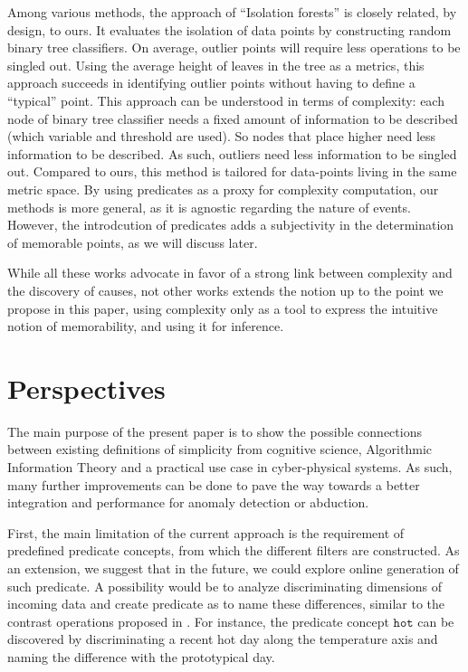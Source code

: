 \documentclass[conference]{IEEEtran}
\begin{document}
Among various methods, the approach of ``Isolation forests''\cite{liu_isolation_2008,hariri_extended_2021} is closely related, by design, to ours. It evaluates the isolation of data points by constructing random binary tree classifiers. On average, outlier points will require less operations to be singled out. Using the average height of leaves in the tree as a metrics, this approach succeeds in identifying outlier points without having to define a ``typical'' point. This approach can be understood in terms of complexity: each node of binary tree classifier needs a fixed amount of information to be described (which variable and threshold are used). So nodes that place higher need less information to be described. As such, outliers need less information to be singled out. Compared to ours, this method is tailored for data-points living in the same metric space. By using predicates as a proxy for complexity computation, our methods is more general, as it is agnostic regarding the nature of events. However, the introdcution of predicates adds a subjectivity in the determination of memorable points, as we will discuss later.

While all these works advocate in favor of a strong link between complexity and the 
discovery of causes, not other works extends the notion up to the point we propose in this paper, using complexity only as a tool to express the intuitive notion of memorability, and using it for inference.

\section{Perspectives}
\label{sec:future}
The main purpose of the present paper is to show the possible connections
between existing definitions of simplicity from cognitive science, Algorithmic
Information Theory and a practical use case in cyber-physical systems. As such,
many further improvements can be done to pave the way towards a better
integration and performance for anomaly detection or abduction.

First, the main limitation of the current approach is the requirement of
predefined predicate concepts, from which the different filters are constructed.
As an extension, we suggest that in the future, we could explore online
generation of such predicate. A possibility would be to analyze discriminating
dimensions of incoming data and create predicate as to name these differences,
similar to the contrast operations proposed in \cite{dessalles_conceptual_2015,
  gardenfors2004conceptual}. For instance, the predicate concept $\mathtt{hot}$
can be discovered by discriminating a recent hot day along the
temperature axis and naming the difference with the prototypical day.
\end{document}
